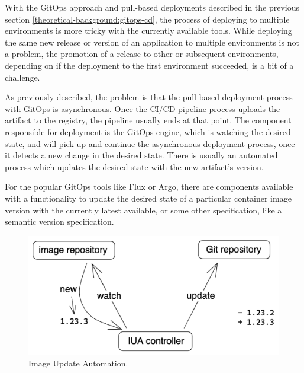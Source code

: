 With the GitOps approach and pull-based deployments described in the previous section \ref{theoretical-background:gitops-cd},
the process of deploying to multiple environments is more tricky with the currently available tools.
While deploying the same new release or version of an application to multiple environments is not a problem,
the promotion of a release to other or subsequent environments, depending on if the deployment to the first environment succeeded,
is a bit of a challenge.

As previously described, the problem is that the pull-based deployment process with GitOps is asynchronous.
Once the CI/CD pipeline process uploads the artifact to the registry, the pipeline usually ends at that point.
The component responsible for deployment is the GitOps engine, which is watching the desired state,
and will pick up and continue the asynchronous deployment process, once it detects a new change in the desired state.
There is usually an automated process which updates the desired state with the new artifact's version.


For the popular GitOps tools like Flux or Argo,
there are components available with a functionality to update the desired state
of a particular container image version with the currently latest available, or some other specification, like a semantic version specification.

\begin{figure}[h]
	\centering
	\includegraphics[width=0.72\linewidth]{assets/image-update-automation-illustration.png}
	\caption{Image Update Automation.
	}
	\label{fig:image-update-automation-illustration}	
\end{figure}

